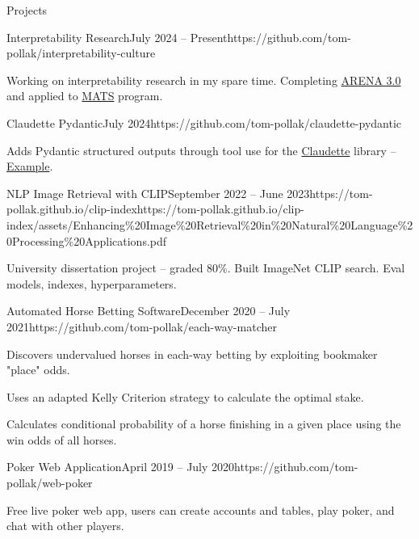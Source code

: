 \documentclass{structure}
\begin{document}
\begin{rSection}{Projects}

    \begin{rSubsection}{Interpretability Research}{July 2024 -- Present}{}{}{https://github.com/tom-pollak/interpretability-culture}{}
        \item Working on interpretability research in my spare time. Completing \href{https://arena3-chapter1-transformer-interp.streamlit.app/}{ARENA 3.0} and applied to \href{https://www.matsprogram.org/}{MATS} program.
    \end{rSubsection}

    \begin{rSubsection}{Claudette Pydantic}{July 2024}{}{}{https://github.com/tom-pollak/claudette-pydantic}{}
        \item Adds Pydantic structured outputs through tool use for the \href{https://github.com/AnswerDotAI/claudette}{Claudette} library -- {\color{blue}\href{https://nbviewer.org/github/tom-pollak/claudette-pydantic/blob/main/nbs/examples/pet_store.ipynb}{Example}}.
    \end{rSubsection}

    \begin{rSubsection}{NLP Image Retrieval with CLIP}{September 2022 -- June 2023}{}{}{https://tom-pollak.github.io/clip-index}{https://tom-pollak.github.io/clip-index/assets/Enhancing\%20Image\%20Retrieval\%20in\%20Natural\%20Language\%20Processing\%20Applications.pdf}
        \item University dissertation project -- graded 80\%. Built ImageNet CLIP search. Eval models, indexes, hyperparameters.
    \end{rSubsection}

    \begin{rSubsection}{Automated Horse Betting Software}{December 2020 -- July 2021}{}{}{https://github.com/tom-pollak/each-way-matcher}{}
        \item Discovers undervalued horses in each-way betting by exploiting bookmaker "place" odds.
        \item Uses an adapted Kelly Criterion strategy to calculate the optimal stake.
        \item Calculates conditional probability of a horse finishing in a given place using the win odds of all horses.
    \end{rSubsection}

    \begin{rSubsection}{Poker Web Application}{April 2019 -- July 2020}{}{}{https://github.com/tom-pollak/web-poker}{}
        \item Free live poker web app, users can create accounts and tables, play poker, and chat with other players.
    \end{rSubsection}

\end{rSection}
\end{document}
